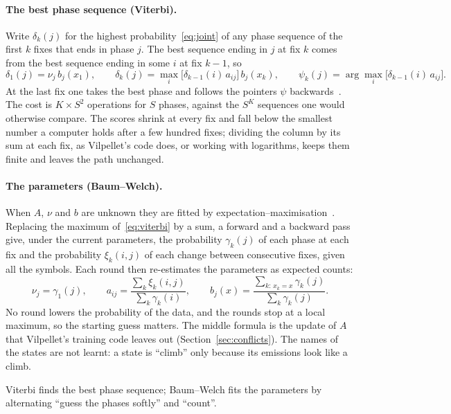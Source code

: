 \paragraph{The best phase sequence (Viterbi).} Write $\delta_k(j)$ for the highest
probability~\eqref{eq:joint} of any phase sequence of the first $k$ fixes that ends in phase $j$.
The best sequence ending in $j$ at fix $k$ comes from the best sequence ending in some $i$ at fix
$k-1$, so
\begin{equation}\label{eq:viterbi}
  \delta_1(j)=\nu_j\,b_j(x_1),\qquad
  \delta_k(j)=\max_i\bigl[\delta_{k-1}(i)\,a_{ij}\bigr]\,b_j(x_k),\qquad
  \psi_k(j)=\arg\max_i\bigl[\delta_{k-1}(i)\,a_{ij}\bigr].
\end{equation}
At the last fix one takes the best phase and follows the pointers $\psi$ backwards~\cite{viterbi1967,forney1973}.
The cost is $K\times S^2$ operations for $S$ phases, against the $S^K$ sequences one would
otherwise compare. The scores shrink at every fix and fall below the smallest number a computer
holds after a few hundred fixes; dividing the column by its sum at each fix, as Vilpellet's code
does, or working with logarithms, keeps them finite and leaves the path unchanged.

\paragraph{The parameters (Baum--Welch).} When $A$, $\nu$ and $b$ are unknown they are fitted by
expectation--maximisation~\cite{baum1970,rabiner1989}. Replacing the maximum of~\eqref{eq:viterbi}
by a sum, a forward and a backward pass give, under the current parameters, the probability
$\gamma_k(j)$ of each phase at each fix and the probability $\xi_k(i,j)$ of each change between
consecutive fixes, given all the symbols. Each round then re-estimates the parameters as expected
counts:
\begin{equation}\label{eq:baumwelch}
  \nu_j=\gamma_1(j),\qquad
  a_{ij}=\frac{\sum_k\xi_k(i,j)}{\sum_k\gamma_k(i)},\qquad
  b_j(x)=\frac{\sum_{k:\,x_k=x}\gamma_k(j)}{\sum_k\gamma_k(j)} .
\end{equation}
No round lowers the probability of the data, and the rounds stop at a local maximum, so the
starting guess matters. The middle formula is the update of $A$ that Vilpellet's training code
leaves out (Section~\ref{sec:conflicts}). The names of the states are not learnt: a state is
``climb'' only because its emissions look like a climb.

\begin{inwords}
Viterbi finds the best phase sequence; Baum--Welch fits the parameters by alternating ``guess the
phases softly'' and ``count''.
\end{inwords}

